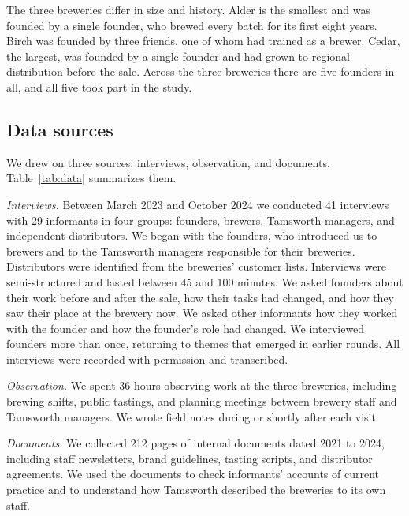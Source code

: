 \documentclass[12pt]{article}
\begin{document}
The three breweries differ in size and history. Alder is the smallest and was founded by a single founder, who brewed every batch for its first eight years. Birch was founded by three friends, one of whom had trained as a brewer. Cedar, the largest, was founded by a single founder and had grown to regional distribution before the sale. Across the three breweries there are five founders in all, and all five took part in the study.

\subsection{Data sources}

We drew on three sources: interviews, observation, and documents. Table~\ref{tab:data} summarizes them.

\textit{Interviews.} Between March 2023 and October 2024 we conducted 41 interviews with 29 informants in four groups: founders, brewers, Tamsworth managers, and independent distributors. We began with the founders, who introduced us to brewers and to the Tamsworth managers responsible for their breweries. Distributors were identified from the breweries' customer lists. Interviews were semi-structured and lasted between 45 and 100 minutes. We asked founders about their work before and after the sale, how their tasks had changed, and how they saw their place at the brewery now. We asked other informants how they worked with the founder and how the founder's role had changed. We interviewed founders more than once, returning to themes that emerged in earlier rounds. All interviews were recorded with permission and transcribed.

\textit{Observation.} We spent 36 hours observing work at the three breweries, including brewing shifts, public tastings, and planning meetings between brewery staff and Tamsworth managers. We wrote field notes during or shortly after each visit.

\textit{Documents.} We collected 212 pages of internal documents dated 2021 to 2024, including staff newsletters, brand guidelines, tasting scripts, and distributor agreements. We used the documents to check informants' accounts of current practice and to understand how Tamsworth described the breweries to its own staff.
\end{document}
